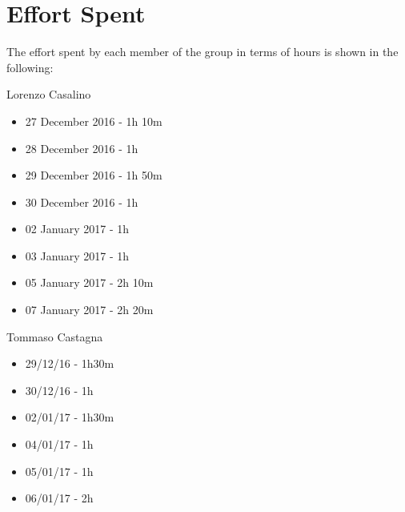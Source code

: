 \section{Effort Spent}

The effort spent by each member of the group in terms of hours is shown in the following:

Lorenzo Casalino

\begin{itemize}
	\item 27 December 2016 - 1h 10m
	\item 28 December 2016 - 1h
	\item 29 December 2016 - 1h 50m
	\item 30 December 2016 - 1h
	\item 02 January  2017 - 1h
	\item 03 January  2017 - 1h
	\item 05 January  2017 - 2h 10m
	\item 07 January  2017 - 2h 20m
\end{itemize}

Tommaso Castagna

\begin{itemize}
	\item 29/12/16 - 1h30m
	\item 30/12/16 - 1h
	\item 02/01/17 - 1h30m
	\item 04/01/17 - 1h
	\item 05/01/17 - 1h
	\item 06/01/17 - 2h
\end{itemize}
